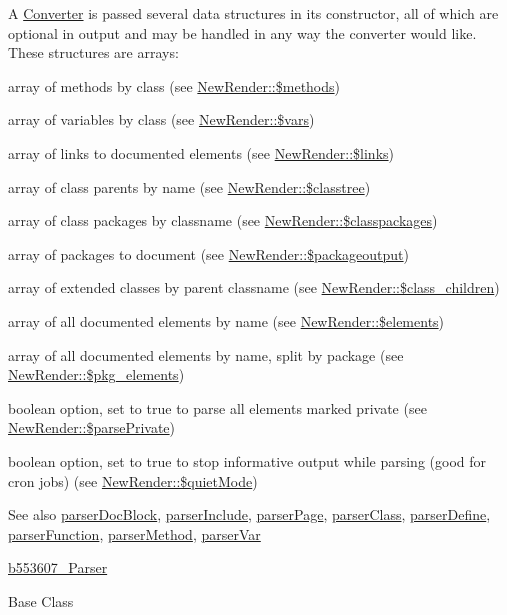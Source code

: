 \-A \hyperlink{class_converter}{\-Converter} is passed several data structures in its constructor, all of which are optional in output and may be handled in any way the converter would like. \-These structures are arrays\-: 
\begin{DoxyItemize}
\item array of methods by class (see \hyperlink{}{\-New\-Render\-::\$methods}) 
\item array of variables by class (see \hyperlink{}{\-New\-Render\-::\$vars}) 
\item array of links to documented elements (see \hyperlink{}{\-New\-Render\-::\$links}) 
\item array of class parents by name (see \hyperlink{}{\-New\-Render\-::\$classtree}) 
\item array of class packages by classname (see \hyperlink{}{\-New\-Render\-::\$classpackages}) 
\item array of packages to document (see \hyperlink{}{\-New\-Render\-::\$packageoutput}) 
\item array of extended classes by parent classname (see \hyperlink{}{\-New\-Render\-::\$class\-\_\-children}) 
\item array of all documented elements by name (see \hyperlink{}{\-New\-Render\-::\$elements}) 
\item array of all documented elements by name, split by package (see \hyperlink{}{\-New\-Render\-::\$pkg\-\_\-elements}) 
\item boolean option, set to true to parse all elements marked  private (see \hyperlink{}{\-New\-Render\-::\$parse\-Private}) 
\item boolean option, set to true to stop informative output while parsing (good for cron jobs) (see \hyperlink{}{\-New\-Render\-::\$quiet\-Mode}) 
\end{DoxyItemize}

\begin{DoxySeeAlso}{\-See also}
\hyperlink{classparser_doc_block}{parser\-Doc\-Block}, \hyperlink{classparser_include}{parser\-Include}, \hyperlink{classparser_page}{parser\-Page}, \hyperlink{classparser_class}{parser\-Class}, \hyperlink{classparser_define}{parser\-Define}, \hyperlink{classparser_function}{parser\-Function}, \hyperlink{classparser_method}{parser\-Method}, \hyperlink{classparser_var}{parser\-Var}

\hyperlink{classb553607___parser}{b553607\-\_\-\-Parser}
\end{DoxySeeAlso}
\-Base \-Class

